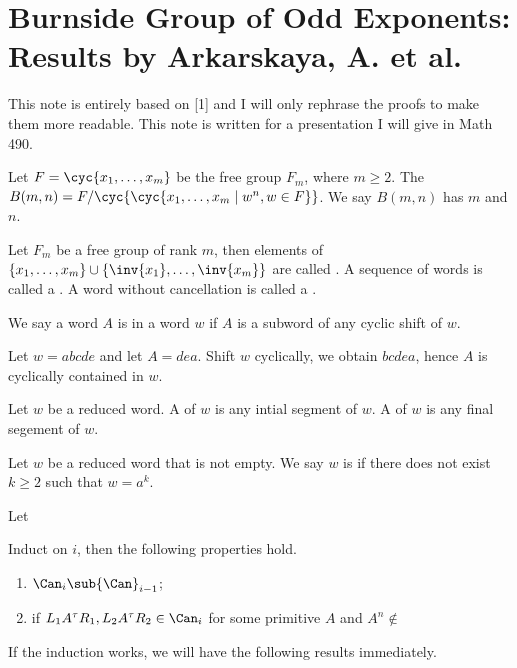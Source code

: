 \section{Burnside Group of Odd Exponents: Results by Arkarskaya, A. et al.}
\par
This note is entirely based on [1] and I will only rephrase the proofs to make them more readable. This note is written for a presentation I will give in Math 490.
\begin{definition}
    Let $F=\cyc{{x}_{1},\dots,{x}_{m}}$ be the free group ${F}_{m}$, where $m\ge 2$. The  $B(m,n)=F/\cyc{\cyc{{x}_{1},\dots,{x}_{m}\mid{w}^{n},w\in F}}$. We say $B(m,n)$ has  $m$ and  $n$.
\end{definition}
\begin{definition}
    Let ${F}_{m}$ be a free group of rank $m$, then elements of $\{{x}_{1},\dots,{x}_{m}\}\cup\{\inv{{x}_{1}},\dots,\inv{{x}_{m}}\}$ are called . A sequence of words is called a . A word without cancellation is called a .
\end{definition}
\begin{definition}
    We say a word $A$ is  in a word $w$ if $A$ is a subword of any cyclic shift of $w$.
\end{definition}
\begin{example}
    Let $w=abcde$ and let $A=dea$. Shift $w$ cyclically, we obtain $bcdea$, hence $A$ is cyclically contained in $w$.
\end{example}
\begin{definition}
    Let $w$ be a reduced word. A  of $w$ is any intial segment of $w$. A  of $w$ is any final segement of $w$.
\end{definition}
\begin{definition}
    Let $w$ be a reduced word that is not empty. We say $w$ is  if there does not exist $k\ge 2$ such that $w={a}^{k}$.
\end{definition}
\begin{definition}
    Let 
\end{definition}
\newpage


\begin{theorem}
    Induct on $i$, then the following properties hold.
    \begin{enumerate}
        \item ${\Can}_{i}\sub{\Can}_{i-1}$;
        \item if ${L}_{1}{A}^{\tau}{R}_{1},{L}_{2}{A}^{\tau}{R}_{2}\in{\Can}_{i}$ for some primitive $A$ and ${A}^{n}\notin$
    \end{enumerate}
\end{theorem}




\par
If the induction works, we will have the following results immediately.
\begin{theorem}
    
\end{theorem}
